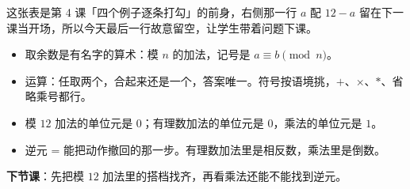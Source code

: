 \begin{zhu}
  这张表是第 4 课「四个例子逐条打勾」的前身，右侧那一行 \(a\) 配 \(12-a\)
  留在下一课当开场，所以今天最后一行故意留空，让学生带着问题下课。
\end{zhu}

\begin{xiaojie}
  \begin{itemize}
    \item 取余数是有名字的算术：模 \(n\) 的加法，记号是 \(a\equiv b\pmod n\)。
    \item 运算：任取两个，合起来还是一个，答案唯一。符号按语境挑，\(+\)、\(\times\)、\(*\)、省略乘号都行。
    \item 模 \(12\) 加法的单位元是 \(0\)；有理数加法的单位元是 \(0\)，乘法的单位元是 \(1\)。
    \item 逆元 = 能把动作撤回的那一步。有理数加法里是相反数，乘法里是倒数。
  \end{itemize}
\end{xiaojie}

\noindent\textbf{下节课}：先把模 \(12\) 加法里的搭档找齐，再看乘法还能不能找到逆元。